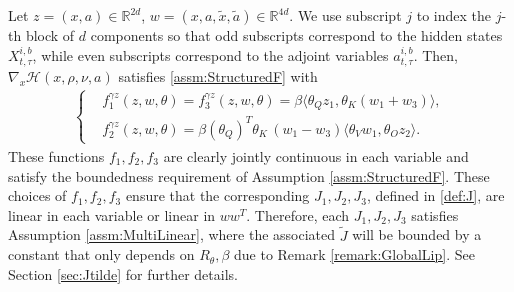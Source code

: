 \documentclass{article}
\newcommand{\R}{\mathbb{R}}
\begin{document}
\begin{appendices}
  Let $z=(x,a)\in\R^{2d}$, $w=(x,a,\tilde{x},\tilde{a})\in\R^{4d}$. We use subscript $j$ to index the $j$-th block of $d$ components so that odd subscripts correspond to the hidden states $X^{i,b}_{t,\tau}$, while even subscripts correspond to the adjoint variables $a^{i,b}_{t,\tau}$. Then, $\nabla_x\mathcal H(x,\rho,\nu,a)$ satisfies \ref{assm:StructuredF} with
\begin{align}\label{eqn:fgz}
    \begin{cases}
    &f^{\gamma z}_1(z,w,\theta) =f^{\gamma z}_3(z,w,\theta) = \beta \langle \theta_Q z_1,\theta_K(w_1+w_3) \rangle,  \\&f^{\gamma z}_2(z,w,\theta) =\beta (\theta_Q )^T\theta_K \,(w_1-w_3)\langle\theta_V w_1, \theta_O z_2\rangle.
    \end{cases}
\end{align}
These functions $f_1,f_2,f_3$ are clearly jointly continuous in each variable and satisfy the boundedness requirement of Assumption \ref{assm:StructuredF}.
These choices of $f_1,f_2,f_3$ ensure that the corresponding $J_1,J_2,J_3$, defined in \ref{def:J}, are linear in each variable or linear in $ww^T$. Therefore, each $J_1,J_2,J_3$ satisfies Assumption \ref{assm:MultiLinear}, where the associated $\widetilde J$ will be bounded by a constant that only depends on $R_\theta,\beta$ due to Remark \ref{remark:GlobalLip}. See Section \ref{sec:Jtilde} for further details.\\


\end{appendices}
\end{document}
